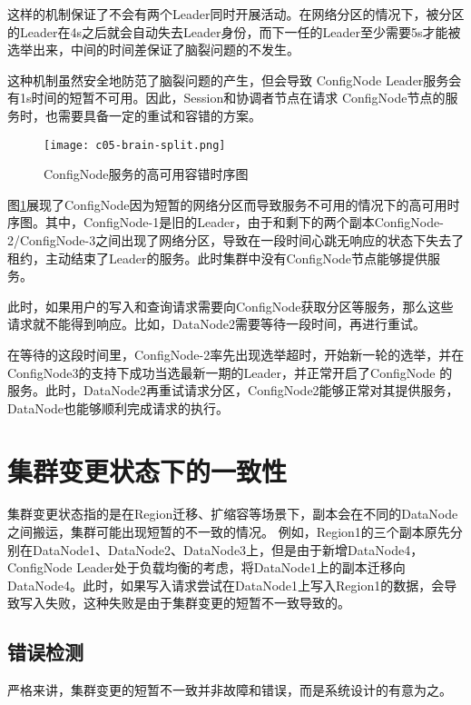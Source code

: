 这样的机制保证了不会有两个Leader同时开展活动。在网络分区的情况下，被分区的Leader在4s之后就会自动失去Leader身份，而下一任的Leader至少需要5s才能被选举出来，中间的时间差保证了脑裂问题的不发生。

这种机制虽然安全地防范了脑裂问题的产生，但会导致 ConfigNode Leader服务会有1s时间的短暂不可用。因此，Session和协调者节点在请求
ConfigNode节点的服务时，也需要具备一定的重试和容错的方案。

\begin{figure}
    \centering
    \texttt{[image: c05-brain-split.png]}
    \caption{ConfigNode服务的高可用容错时序图}
    \label{fig:c05-brain-split}
\end{figure}

图\ref{fig:c05-brain-split}展现了ConfigNode因为短暂的网络分区而导致服务不可用的情况下的高可用时序图。其中，ConfigNode-1是旧的Leader，由于和剩下的两个副本ConfigNode-2/ConfigNode-3之间出现了网络分区，导致在一段时间心跳无响应的状态下失去了租约，主动结束了Leader的服务。此时集群中没有ConfigNode节点能够提供服务。

此时，如果用户的写入和查询请求需要向ConfigNode获取分区等服务，那么这些请求就不能得到响应。比如，DataNode2需要等待一段时间，再进行重试。

在等待的这段时间里，ConfigNode-2率先出现选举超时，开始新一轮的选举，并在ConfigNode3的支持下成功当选最新一期的Leader，并正常开启了ConfigNode 的服务。此时，DataNode2再重试请求分区，ConfigNode2能够正常对其提供服务，DataNode也能够顺利完成请求的执行。


\section{集群变更状态下的一致性}

集群变更状态指的是在Region迁移、扩缩容等场景下，副本会在不同的DataNode之间搬运，集群可能出现短暂的不一致的情况。
例如，Region1的三个副本原先分别在DataNode1、DataNode2、DataNode3上，但是由于新增DataNode4，ConfigNode Leader处于负载均衡的考虑，将DataNode1上的副本迁移向DataNode4。此时，如果写入请求尝试在DataNode1上写入Region1的数据，会导致写入失败，这种失败是由于集群变更的短暂不一致导致的。



\subsection{错误检测}

严格来讲，集群变更的短暂不一致并非故障和错误，而是系统设计的有意为之。

